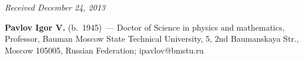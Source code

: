 \vspace*{-6pt}

\hfill{\small\textit{Received December 24, 2013}}

\vspace*{-18pt}

\Contrl

\noindent \textbf{Pavlov Igor V.} (b.\ 1945)~--- Doctor of Science in physics 
and mathematics, Professor, Bauman Moscow State Technical University, 
5, 2nd Baumanskaya Str., Moscow 
105005, Russian Federation; ipavlov@bmstu.ru



 \label{end\stat}
 
\renewcommand{\bibname}{\protect\rm Литература}